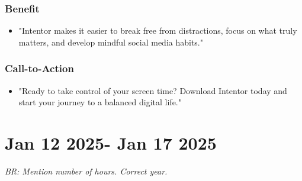 \documentclass[12pt]{article}
\begin{document}
\begin{enumerate}
    \subsubsection{Benefit}
    \begin{itemize}
        \item "Intentor makes it easier to break free from distractions, focus on what truly matters, and develop mindful social media habits."
    \end{itemize}
    \subsubsection{Call-to-Action}
    \begin{itemize}
        \item "Ready to take control of your screen time? Download Intentor today and start your journey to a balanced digital life."
    \end{itemize}
    \end{enumerate}
    \section{Jan 12 2025- Jan 17 2025}
    
    {\it BR: Mention number of hours. Correct year.}
    
\end{document}
